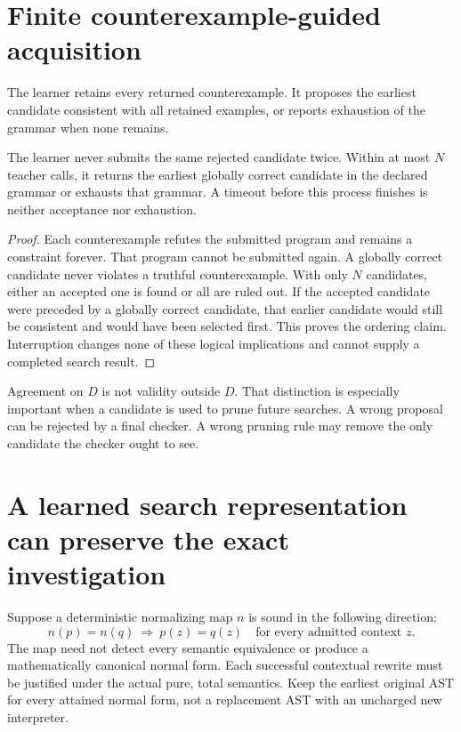 \section{Finite counterexample-guided acquisition}
The learner retains every returned counterexample. It proposes the earliest candidate consistent with all retained examples, or reports exhaustion of the grammar when none remains.

\begin{Coreproposition}\label{Core:r:cegis}
The learner never submits the same rejected candidate twice. Within at most $N$ teacher calls, it returns the earliest globally correct candidate in the declared grammar or exhausts that grammar. A timeout before this process finishes is neither acceptance nor exhaustion.
\end{Coreproposition}
\begin{proof}
Each counterexample refutes the submitted program and remains a constraint forever. That program cannot be submitted again. A globally correct candidate never violates a truthful counterexample. With only $N$ candidates, either an accepted one is found or all are ruled out. If the accepted candidate were preceded by a globally correct candidate, that earlier candidate would still be consistent and would have been selected first. This proves the ordering claim. Interruption changes none of these logical implications and cannot supply a completed search result.
\end{proof}

Agreement on $D$ is not validity outside $D$. That distinction is especially important when a candidate is used to prune future searches. A wrong proposal can be rejected by a final checker. A wrong pruning rule may remove the only candidate the checker ought to see.

\section{A learned search representation can preserve the exact investigation}
Suppose a deterministic normalizing map $n$ is sound in the following direction:
\[
n(p)=n(q)\ \Longrightarrow\ p(z)=q(z)\quad\text{for every admitted context }z.
\]
The map need not detect every semantic equivalence or produce a mathematically canonical normal form. Each successful contextual rewrite must be justified under the actual pure, total semantics. Keep the earliest original AST for every attained normal form, not a replacement AST with an uncharged new interpreter.

